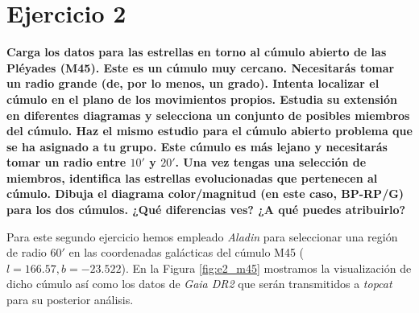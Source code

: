 \documentclass[a4paper,fleqn,usenatbib]{mnras}
\begin{document}
\section{Ejercicio 2}

\textbf{Carga los datos para las estrellas en torno al cúmulo abierto de las Pléyades (M45). Este es un cúmulo muy cercano. Necesitarás tomar un radio grande (de, por lo menos, un grado). Intenta localizar el cúmulo en el plano de los movimientos propios. Estudia su extensión en diferentes diagramas y selecciona un conjunto de posibles miembros del cúmulo. Haz el mismo estudio para el cúmulo abierto problema que se ha asignado a tu grupo. Este cúmulo es más lejano y necesitarás tomar un radio entre $10'$ y $20'$. Una vez tengas una selección de miembros, identifica las estrellas evolucionadas que pertenecen al cúmulo. Dibuja el diagrama color/magnitud (en este caso, BP-RP/G) para los dos cúmulos. ¿Qué diferencias ves? ¿A qué puedes atribuirlo?}

Para este segundo ejercicio hemos empleado \emph{Aladin} para seleccionar una región de radio $60'$ en las coordenadas galácticas del cúmulo M45 ($l=166.57, b=-23.522$). En la Figura \ref{fig:e2_m45} mostramos la visualización de dicho cúmulo así como los datos de \emph{Gaia DR2} que serán transmitidos a \emph{topcat} para su posterior análisis.
\end{document}
